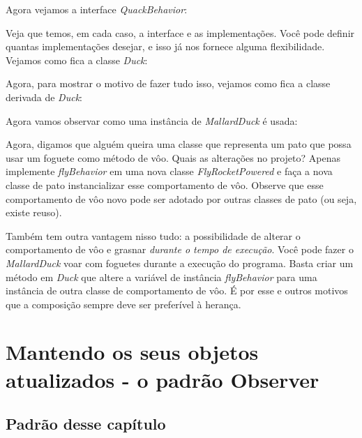 \documentclass[a4paper,11pt]{report}
\begin{document}

Agora vejamos a interface \textit{QuackBehavior}:\\


Veja que temos, em cada caso, a interface e as implementações. Você pode definir quantas implementações desejar, e isso já nos fornece alguma flexibilidade. Vejamos como fica a classe \textit{Duck}:


Agora, para mostrar o motivo de fazer tudo isso, vejamos como fica a classe derivada de \textit{Duck}:\\


Agora vamos observar como uma instância de \textit{MallardDuck} é usada:\\


Agora, digamos que alguém queira uma classe que representa um pato que possa usar um foguete como método de vôo. Quais as alterações no projeto? Apenas implemente \textit{flyBehavior} em uma nova classe \textit{FlyRocketPowered} e faça a nova classe de pato instancializar esse comportamento de vôo. Observe que esse comportamento de vôo novo pode ser adotado por outras classes de pato (ou seja, existe reuso).

Também tem outra vantagem nisso tudo: a possibilidade de alterar o comportamento de vôo e grasnar \textit{durante o tempo de execução}. Você pode fazer o \textit{MallardDuck} voar com foguetes durante a execução do programa. Basta criar um método em \textit{Duck} que altere a variável de instância \textit{flyBehavior} para uma instância de outra classe de comportamento de vôo. É por esse e outros motivos que a composição sempre deve ser preferível à herança.

\chapter{Mantendo os seus objetos atualizados - o padrão Observer}
\label{chap:observer}

\section{Padrão desse capítulo}
\end{document}
